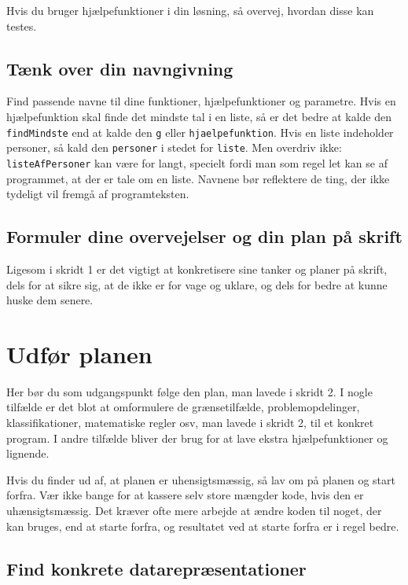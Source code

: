 \documentclass[a4paper,12pt]{article}
\begin{document}
Hvis du bruger hjælpefunktioner i din løsning, så overvej, hvordan
disse kan testes.

\subsection*{Tænk over din navngivning}

Find passende navne til dine funktioner, hjælpefunktioner og
parametre.  Hvis en hjælpefunktion skal finde det mindste tal i en
liste, så er det bedre at kalde den \texttt{findMindste} end at kalde
den \texttt{g} eller \texttt{hjaelpefunktion}.  Hvis en liste
indeholder personer, så kald den \texttt{personer} i stedet for
\texttt{liste}.  Men overdriv ikke: \texttt{listeAfPersoner} kan være
for langt, specielt fordi man som regel let kan se af programmet, at
der er tale om en liste.  Navnene bør reflektere de ting, der ikke
tydeligt vil fremgå af programteksten.

\subsection*{Formuler dine overvejelser og din plan på skrift}

Ligesom i skridt 1 er det vigtigt at konkretisere sine tanker og
planer på skrift, dels for at sikre sig, at de ikke er for vage og
uklare, og dels for bedre at kunne huske dem senere.

\section{Udfør planen}

Her bør du som udgangspunkt følge den plan, man lavede i skridt 2.  I
nogle tilfælde er det blot at omformulere de grænsetilfælde,
problemopdelinger, klassifikationer, matematiske regler osv, man
lavede i skridt 2, til et konkret program.  I andre tilfælde bliver
der brug for at lave ekstra hjælpefunktioner og lignende.

Hvis du finder ud af, at planen er uhensigtsmæssig, så lav om på
planen og start forfra.  Vær ikke bange for at kassere selv store
mængder kode, hvis den er uhænsigtsmæssig.  Det kræver ofte mere
arbejde at ændre koden til noget, der kan bruges, end at starte
forfra, og resultatet ved at starte forfra er i regel bedre.

\subsection*{Find konkrete datarepræsentationer}
\end{document}
